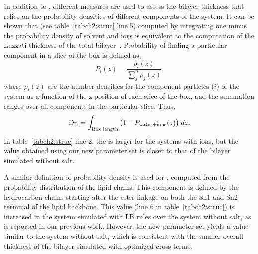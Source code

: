 In addition to \dhh{}, different measures are used to assess the bilayer thickness 
that relies on the probability densities of different components of the system.
It can be shown that \db{}(see table~\ref{tabch2:struc} line 5) computed by integrating one minus
the probability density of solvent and ions is equivalent to the computation of the 
Luzzati thickness of the total bilayer~\cite{fogarty:2015,chiu:2009}.
Probability of finding a particular component in a slice of the box is defined as,
\begin{equation}
    \label{eq:probability}
    P_{i}(z) = \frac{\rho_i(z)}{\sum^n_{j}\rho_{j}(z)}\text{,}
\end{equation}
where $\rho_{i}(z)$ are the number densities for the 
component particles ($i$) of the system as a function of the 
z-position of each slice of the box, and the summation
ranges over all components in the particular slice.
Thus, 
\begin{equation}
\text{$\text{D}_\text{B}$}=\int_{\text{Box length}}\big(1-P_{\text{water}+\text{ions}}(z)\big)\;dz\text{.}
\end{equation}
In table~\ref{tabch2:struc} line 2, the \db{} is larger for the systems
with ions, but the value obtained using our new parameter set is closer to that of
the bilayer simulated without salt.

A similar definition of probability density is used for \dc{}, 
computed from the probability distribution of the lipid chains. 
This component is defined by the hydrocarbon chains starting after the ester-linkage
on both the Sn1 and Sn2 terminal of the lipid backbone. 
This value (line 6 in table~\ref{tabch2:struc}) is increased in the system simulated
with LB rules over the system without salt, 
as is reported in our previous work. 
However, the new parameter set yields a value similar to the system without salt, 
which is consistent with the smaller overall thickness of the bilayer 
simulated with optimized cross terms.

